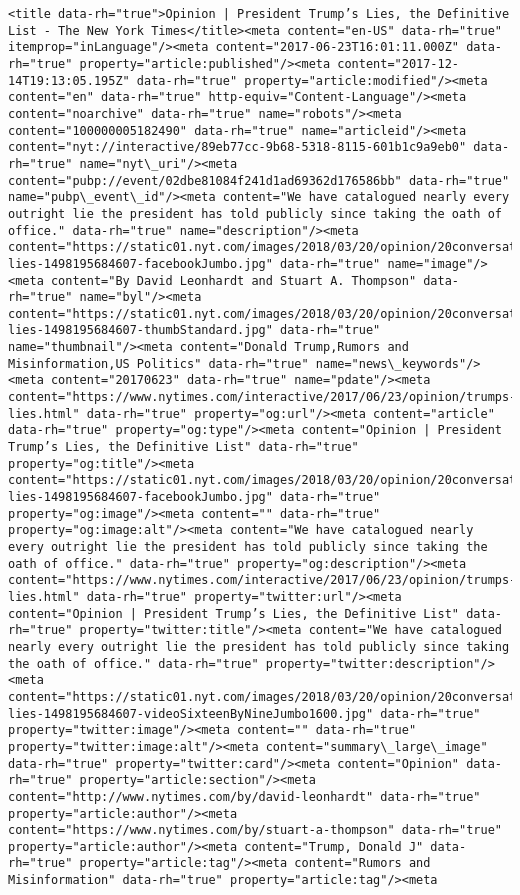 \documentclass[11pt]{article}
\begin{document}
\begin{Verbatim}[commandchars=\\\{\}]
         <title data-rh="true">Opinion | President Trump’s Lies, the Definitive List - The New York Times</title><meta content="en-US" data-rh="true" itemprop="inLanguage"/><meta content="2017-06-23T16:01:11.000Z" data-rh="true" property="article:published"/><meta content="2017-12-14T19:13:05.195Z" data-rh="true" property="article:modified"/><meta content="en" data-rh="true" http-equiv="Content-Language"/><meta content="noarchive" data-rh="true" name="robots"/><meta content="100000005182490" data-rh="true" name="articleid"/><meta content="nyt://interactive/89eb77cc-9b68-5318-8115-601b1c9a9eb0" data-rh="true" name="nyt\_uri"/><meta content="pubp://event/02dbe81084f241d1ad69362d176586bb" data-rh="true" name="pubp\_event\_id"/><meta content="We have catalogued nearly every outright lie the president has told publicly since taking the oath of office." data-rh="true" name="description"/><meta content="https://static01.nyt.com/images/2018/03/20/opinion/20conversation/trumps-lies-1498195684607-facebookJumbo.jpg" data-rh="true" name="image"/><meta content="By David Leonhardt and Stuart A. Thompson" data-rh="true" name="byl"/><meta content="https://static01.nyt.com/images/2018/03/20/opinion/20conversation/trumps-lies-1498195684607-thumbStandard.jpg" data-rh="true" name="thumbnail"/><meta content="Donald Trump,Rumors and Misinformation,US Politics" data-rh="true" name="news\_keywords"/><meta content="20170623" data-rh="true" name="pdate"/><meta content="https://www.nytimes.com/interactive/2017/06/23/opinion/trumps-lies.html" data-rh="true" property="og:url"/><meta content="article" data-rh="true" property="og:type"/><meta content="Opinion | President Trump’s Lies, the Definitive List" data-rh="true" property="og:title"/><meta content="https://static01.nyt.com/images/2018/03/20/opinion/20conversation/trumps-lies-1498195684607-facebookJumbo.jpg" data-rh="true" property="og:image"/><meta content="" data-rh="true" property="og:image:alt"/><meta content="We have catalogued nearly every outright lie the president has told publicly since taking the oath of office." data-rh="true" property="og:description"/><meta content="https://www.nytimes.com/interactive/2017/06/23/opinion/trumps-lies.html" data-rh="true" property="twitter:url"/><meta content="Opinion | President Trump’s Lies, the Definitive List" data-rh="true" property="twitter:title"/><meta content="We have catalogued nearly every outright lie the president has told publicly since taking the oath of office." data-rh="true" property="twitter:description"/><meta content="https://static01.nyt.com/images/2018/03/20/opinion/20conversation/trumps-lies-1498195684607-videoSixteenByNineJumbo1600.jpg" data-rh="true" property="twitter:image"/><meta content="" data-rh="true" property="twitter:image:alt"/><meta content="summary\_large\_image" data-rh="true" property="twitter:card"/><meta content="Opinion" data-rh="true" property="article:section"/><meta content="http://www.nytimes.com/by/david-leonhardt" data-rh="true" property="article:author"/><meta content="https://www.nytimes.com/by/stuart-a-thompson" data-rh="true" property="article:author"/><meta content="Trump, Donald J" data-rh="true" property="article:tag"/><meta content="Rumors and Misinformation" data-rh="true" property="article:tag"/><meta 
\end{Verbatim}
\end{document}
